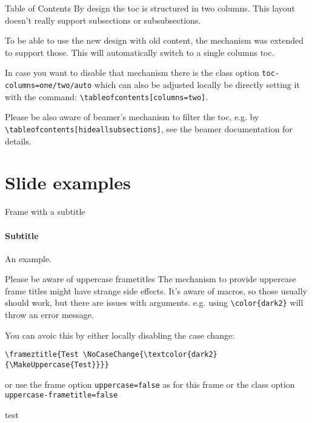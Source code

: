 \documentclass[
	english, %
	design=2023, %
	]{tudabeamer}
\newcommand*{\code}[1]{\texttt{#1}}
\begin{document}
\begin{frame}{Table of Contents}
By design the toc is structured in two columns. This layout doesn't really support subsections or subsubsections.

To be able to use the new design with old content, the mechanism was extended to support those. This will automatically switch to a single columns toc.

In case you want to disable that mechanism there is the class option \code{toc-columns=one/two/auto} which can also be adjusted locally be directly setting it with the command: \code{\textbackslash{}tableofcontents[columns=two]}.

Please be also aware of beamer's mechanism to filter the toc, e.g. by \code{\textbackslash{}tableofcontents[hideallsubsections]}, see the beamer documentation for details.
\end{frame}

\section{Slide examples}

\begin{frame}{Frame with a subtitle}
\framesubtitle{Subtitle}
An example.
\end{frame}

\begin{frame}[fragile,uppercase=false]{Please be aware of uppercase frametitles}
The mechanism to provide uppercase frame titles might have strange side effects.
It's aware of macros, so those usually should work, but there are issues with arguments. e.g. using \verb+\color{dark2}+ will throw an error message.

You can avoic this by either locally disabling the case change:

\begin{verbatim}
\frameztitle{Test \NoCaseChange{\textcolor{dark2}{\MakeUppercase{Test}}}}
\end{verbatim}
or use the frame option \verb+uppercase=false+ as for this frame or the class option \verb+uppercase-frametitle=false+
\end{frame}

\textcolor{TUDa-dark1}{test}

\end{document}
